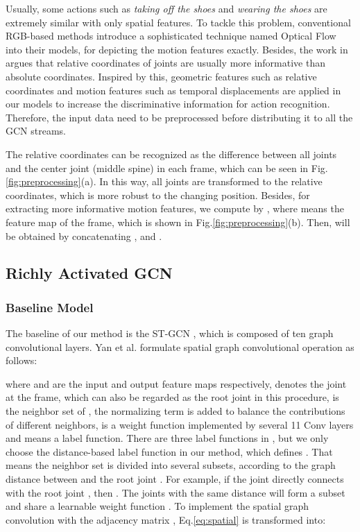 \documentclass[journal]{IEEEtran}
\begin{document}
Usually, some actions such as {\it taking off the shoes} and {\it wearing the shoes} are extremely similar with only spatial features. To tackle this problem, conventional RGB-based methods introduce a sophisticated technique named Optical Flow \cite{wang2016temporal} into their models, for depicting the motion features exactly. Besides, the work in \cite{thakkar2018part} argues that relative coordinates of joints are usually more informative than absolute coordinates. Inspired by this, geometric features such as relative coordinates and motion features such as temporal displacements are applied in our models to increase the discriminative information for action recognition. Therefore, the input data need to be preprocessed before distributing it to all the GCN streams.

The relative coordinates can be recognized as the difference  between all joints and the center joint (middle spine) in each frame, which can be seen in Fig.\ref{fig:preprocessing}(a). In this way, all joints are transformed to the relative coordinates, which is more robust to the changing position. Besides, for extracting more informative motion features, we compute  by , where  means the feature map of the  frame, which is shown in Fig.\ref{fig:preprocessing}(b). Then,  will be obtained by concatenating ,  and .

\subsection{Richly Activated GCN}
\label{ssec:methods}

\subsubsection{Baseline Model}
\label{sssec:baseline}

The baseline of our method is the ST-GCN \cite{yan2018spatial}, which is composed of ten graph convolutional layers. Yan et al. \cite{yan2018spatial} formulate spatial graph convolutional operation as follows:

where  and  are the input and output feature maps respectively,  denotes the  joint at the  frame, which can also be regarded as the root joint in this procedure,  is the neighbor set of , the normalizing term  is added to balance the contributions of different neighbors,  is a weight function implemented by several 11 Conv layers and  means a label function. There are three label functions in \cite{yan2018spatial}, but we only choose the distance-based label function in our method, which defines . That means the neighbor set  is divided into several subsets, according to the graph distance between  and the root joint . For example, if the joint  directly connects with the root joint , then . The joints with the same distance will form a subset and share a learnable weight function . To implement the spatial graph convolution with the adjacency matrix , Eq.\ref{eq:spatial} is transformed into:
\end{document}
